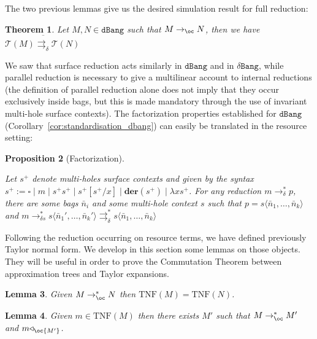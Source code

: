 \documentclass[10pt,a4paper]{article}
\newtheorem{theorem}{Theorem}
\newtheorem{lemma}[theorem]{Lemma}
\newtheorem{proposition}[theorem]{Proposition}
\newif\iflong
\newcommand{\<}{\langle}
\renewcommand{\>}{\rangle}
\newcommand{\der}[1]{\ensuremath{\mathbf{der}(#1)}}
\newcommand{\dbang}{\ensuremath{\mathtt{dBang}}}
\newcommand{\dbangres}{\ensuremath{\mathtt{\delta Bang}}}
\newcommand{\todbf}{\to_{\oc}} %
\newcommand{\todbrs}{\to_{\delta s}} %
\newcommand{\todbrf}{\to_{\delta}} %
\newcommand{\totodbr}{\rightrightarrows_{\delta}} %
\newcommand{\extend}[1]{\overline{#1}}
\newcommand{\app}{\triangleleft_\oc} %
\newcommand{\taylor}[1]{\ensuremath{\mathcal{T}(#1)}}
\newcommand{\taylornf}[1]{\ensuremath{\text{TNF}(#1)}}
\newif\iflong\longtrue
\newcommand{\nativeemdash}{\ifmmode\text{\textemdash}\else\textemdash\fi}
\begin{document}
The two previous lemmas give us the desired simulation result for full reduction:
\begin{theorem}\label{thm:simu_dbang_full}
	Let $M,N\in\dbang$ such that $M\todbf N$, then we have
	$
		\taylor M \extend{\totodbr}\taylor N
	$
\end{theorem}

We saw that surface reduction acts similarly in $\dbang$ and in $\dbangres$,
while parallel reduction is necessary to give a multilinear account to internal
reductions (the definition of parallel reduction alone does not imply that they
occur exclusively inside bags, but this is made mandatory through the use of invariant multi-hole
surface contexts). The factorization properties established for \dbang{}
(Corollary~\ref{cor:standardisation_dbang}) can easily be
translated in the resource setting:

\begin{proposition}[Factorization]\label{prop:standardisation_resources}

	Let $s^+$ denote multi-holes surface contexts and given by the syntax
	$
		s^+:= \square\mid m\mid	s^+s^+\mid s^+[s^+/x]\mid \der{s^+}\mid \lambda xs^+
	$.
	For any reduction $m\todbrf^* p$, there are some bags $\bar n_i$ and some
	multi-hole context $s$ such that $p=s\<\bar n_1,\dots ,\bar n_k\>$ and 
	$
		m\todbrs^*s\<\bar n_1',\dots ,\bar n_k'\>\totodbr^*s\<\bar n_1,\dots ,\bar n_k\>
	$
\end{proposition}


Following the reduction occurring on resource terms, we have defined
previously Taylor normal form. \iflong We develop in this section some lemmas
on those objects. They will \else The following lemmas will\fi be useful in order to prove the
Commutation Theorem between approximation trees and Taylor expansions. 
\begin{lemma}
	\label{lem:bohm-taylor:equiv-imply-same-nfTaylor}
	Given $M \todbf^* N$ then $\taylornf M = \taylornf N$.
\end{lemma}

\begin{lemma}
	\label{lem:taylor:approx-in-reduces-bis}
	Given $m \in \taylornf M$ then there exists $M'$ such that $M \todbf^*
	M'$ and $m\app {M'}$.
\end{lemma}
\end{document}
